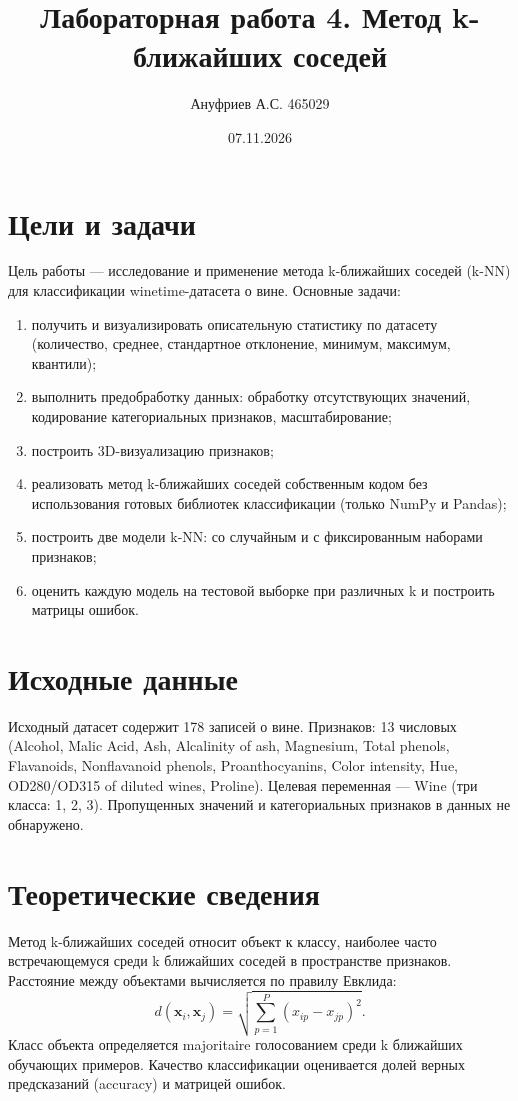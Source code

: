 \documentclass[12pt,a4paper]{article}
\title{Лабораторная работа 4. Метод k-ближайших соседей}
\author{Ануфриев А.С. 465029}
\date{07.11.2026}
\begin{document}
\maketitle

\section{Цели и задачи}
Цель работы --- исследование и применение метода k-ближайших соседей (k-NN) для классификации winetime-датасета о вине. Основные задачи:
\begin{enumerate}
\item получить и визуализировать описательную статистику по датасету (количество, среднее, стандартное отклонение, минимум, максимум, квантили);
\item выполнить предобработку данных: обработку отсутствующих значений, кодирование категориальных признаков, масштабирование;
\item построить 3D-визуализацию признаков;
\item реализовать метод k-ближайших соседей собственным кодом без использования готовых библиотек классификации (только NumPy и Pandas);
\item построить две модели k-NN: со случайным и с фиксированным наборами признаков;
\item оценить каждую модель на тестовой выборке при различных k и построить матрицы ошибок.
\end{enumerate}

\section{Исходные данные}
Исходный датасет содержит 178 записей о вине. Признаков: 13 числовых (Alcohol, Malic Acid, Ash, Alcalinity of ash, Magnesium, Total phenols, Flavanoids, Nonflavanoid phenols, Proanthocyanins, Color intensity, Hue, OD280/OD315 of diluted wines, Proline). Целевая переменная --- Wine (три класса: 1, 2, 3). Пропущенных значений и категориальных признаков в данных не обнаружено.

\section{Теоретические сведения}
Метод k-ближайших соседей относит объект к классу, наиболее часто встречающемуся среди k ближайших соседей в пространстве признаков. Расстояние между объектами вычисляется по правилу Евклида:
\begin{equation}
d(\mathbf{x}_i, \mathbf{x}_j) = \sqrt{\sum_{p=1}^{P} (x_{ip} - x_{jp})^2}.
\end{equation}
Класс объекта определяется majoritaire голосованием среди k ближайших обучающих примеров. Качество классификации оценивается долей верных предсказаний (accuracy) и матрицей ошибок.
\end{document}
